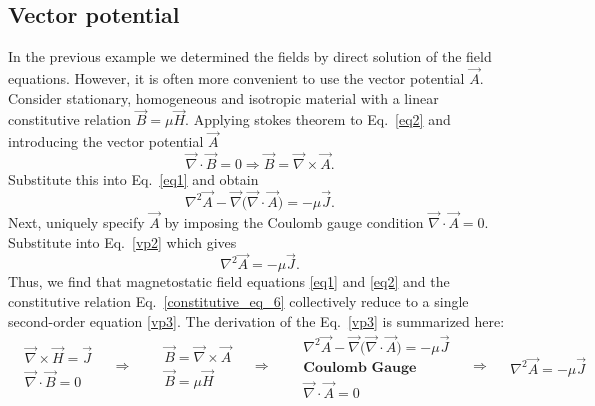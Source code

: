 \documentclass[11pt,a4paper,oneside]{book}
\numberwithin{equation}{section}
\theoremstyle{it}
\theoremstyle{definition}
\begin{document}
\subsection{Vector potential}
In the previous example we determined the fields by direct solution of the field equations. However, it is often more convenient to use the vector potential $\vec{A}$. 
Consider stationary, homogeneous and isotropic material with a linear constitutive relation $\vec{B}=\mu\vec{H}$. Applying stokes theorem to Eq.~\eqref{eq2} and introducing the vector potential $\vec{A}$ 
\begin{equation}\label{vp1}
	\vec{\nabla}\cdot\vec{B}=0\Rightarrow\vec{B}=\vec{\nabla}\times\vec{A}.
\end{equation}
Substitute this into Eq.~\eqref{eq1} and obtain 
\begin{equation}\label{vp2}
	\nabla^2\vec{A}-\vec{\nabla}\big( \vec{\nabla}\cdot\vec{A}\big)=-\mu\vec{J}.
\end{equation}
Next, uniquely specify $\vec{A}$ by imposing the Coulomb gauge condition $\vec{\nabla}\cdot\vec{A}=0$. Substitute into Eq.~\eqref{vp2} which gives
\begin{equation}\label{vp3}
	\nabla^2\vec{A}=-\mu\vec{J}.
\end{equation}
Thus, we find that magnetostatic field equations \ref{eq1} and \ref{eq2} and the constitutive relation Eq.~\eqref{constitutive_eq_6} collectively reduce to a single second-order equation \ref{vp3}. The derivation of the Eq.~\eqref{vp3} is summarized here:
\begin{equation*}\label{}
\boxed{	\begin{aligned}
		&\vec{\nabla}\times\vec{H}=\vec{J}\\[6pt]
		&\vec{\nabla}\cdot\vec{B}=0
	\end{aligned}}\quad\Rightarrow\quad
\boxed{	\begin{aligned}
		&\vec{B}=\vec{\nabla}\times\vec{A}\\[6pt]
		&\vec{B}=\mu\vec{H}
	\end{aligned}}\quad\Rightarrow\quad
\boxed{	\begin{aligned}
		&\nabla^2\vec{A}-\vec{\nabla}\big( \vec{\nabla}\cdot\vec{A}\big)=-\mu\vec{J}\\[6pt]
		&\textbf{Coulomb Gauge} \\[6pt]
		&\vec{\nabla}\cdot\vec{A}=0
	\end{aligned}}\quad\Rightarrow\quad
\boxed{	\begin{aligned}
		\nabla^2\vec{A}=-\mu\vec{J}
\end{aligned}}
\end{equation*}
\end{document}
